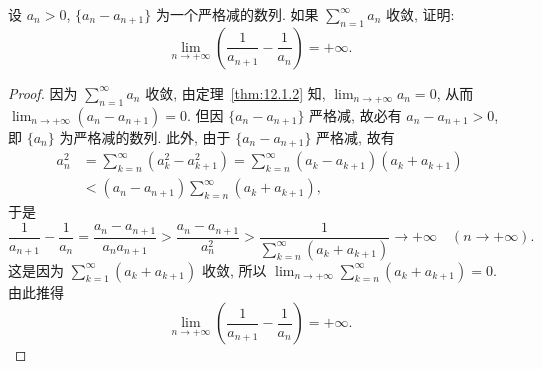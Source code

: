 \begin{example}\label{ex:12.1.6}
设 $a_{n}>0$, $\{a_{n}-a_{n+1}\}$ 为一个严格减的数列. 如果 $\sum_{n=1}^{\infty}a_{n}$ 收敛, 证明:
\[
  \lim_{n\to+\infty}\left(\frac{1}{a_{n+1}}-\frac{1}{a_{n}}\right)=+\infty.
\]
\end{example}

\begin{proof}
因为 $\sum_{n=1}^{\infty}a_{n}$ 收敛, 由定理~\ref{thm:12.1.2} 知, $\lim_{n\to+\infty}a_{n}=0$, 从而 $\lim_{n\to+\infty}(a_{n}-a_{n+1})=0$. 但因 $\{a_{n}-a_{n+1}\}$ 严格减, 故必有 $a_{n}-a_{n+1}>0$, 即 $\{a_{n}\}$ 为严格减的数列. 此外, 由于 $\{a_{n}-a_{n+1}\}$ 严格减, 故有
\begin{align*}
  a_{n}^{2}&=\sum_{k=n}^{\infty}\left(a_{k}^{2}-a_{k+1}^{2}\right)
   =\sum_{k=n}^{\infty}\left(a_{k}-a_{k+1}\right)\left(a_{k}+a_{k+1}\right) \\
  &<\left(a_{n}-a_{n+1}\right)\sum_{k=n}^{\infty}\left(a_{k}+a_{k+1}\right),
\end{align*}
于是
\[
  \frac{1}{a_{n+1}}-\frac{1}{a_{n}}=\frac{a_{n}-a_{n+1}}{a_{n}a_{n+1}}>\frac{a_{n}-a_{n+1}}{a_{n}^{2}}>\frac{1}{\sum_{k=n}^{\infty}(a_{k}+a_{k+1})}\to+\infty\quad(n\to+\infty).
\]
这是因为 $\sum_{k=1}^{\infty}(a_{k}+a_{k+1})$ 收敛, 所以 $\lim_{n\to+\infty}\sum_{k=n}^{\infty}(a_{k}+a_{k+1})=0$. 由此推得
\[
  \lim_{n\to+\infty}\left(\frac{1}{a_{n+1}}-\frac{1}{a_{n}}\right)=+\infty.
\]
\end{proof}

